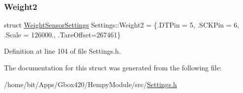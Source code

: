 \subsubsection{\texorpdfstring{Weight2}{Weight2}}
{\footnotesize\ttfamily struct \hyperlink{struct_settings_1_1_weight_sensor_settings}{Weight\+Sensor\+Settings} Settings\+::\+Weight2 = \{.D\+T\+Pin = 5, .S\+C\+K\+Pin = 6, .Scale = 126000., .Tare\+Offset=267461\}}



Definition at line 104 of file Settings.\+h.



The documentation for this struct was generated from the following file\+:\begin{DoxyCompactItemize}
\item 
/home/bit/\+Apps/\+Gbox420/\+Hempy\+Module/src/\hyperlink{_hempy_module_2src_2_settings_8h}{Settings.\+h}\end{DoxyCompactItemize}
